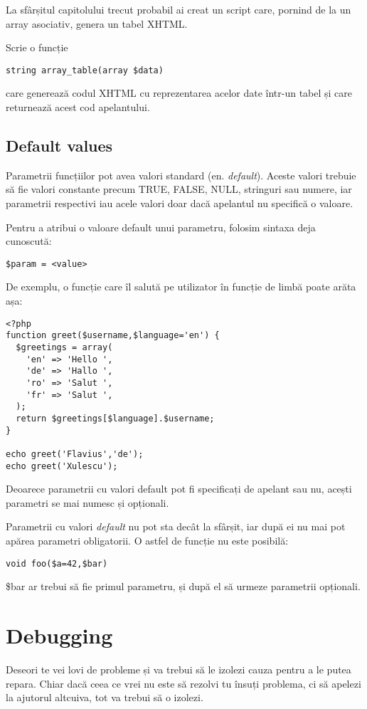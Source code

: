 \begin{Exercise}[title={Afișarea unui array bidimensional}]
La sfârșitul capitolului trecut probabil ai creat un script
care, pornind de la un array asociativ, genera un tabel XHTML.

Scrie o funcție
\begin{verbatim}
string array_table(array $data)
\end{verbatim}
care generează codul XHTML cu reprezentarea acelor date într-un tabel
și care returnează acest cod apelantului.
\end{Exercise}

\subsection{Default values}
Parametrii funcțiilor pot avea valori standard (en. \textsl{default}).
Aceste valori trebuie să fie valori constante precum TRUE, FALSE, NULL,
stringuri sau numere, iar parametrii respectivi iau acele valori doar
dacă apelantul nu specifică o valoare.

Pentru a atribui o valoare default unui parametru, folosim sintaxa deja
cunoscută:
\begin{verbatim}
$param = <value>
\end{verbatim}

De exemplu, o funcție care îl salută pe utilizator în funcție de limbă
poate arăta așa:

\begin{lstlisting}
<?php
function greet($username,$language='en') {
  $greetings = array(
	'en' => 'Hello ',
	'de' => 'Hallo ',
	'ro' => 'Salut ',
	'fr' => 'Salut ',
  );
  return $greetings[$language].$username;
}

echo greet('Flavius','de');
echo greet('Xulescu');
\end{lstlisting}
Deoarece parametrii cu valori default pot fi specificați de
apelant sau nu, acești parametri se mai numesc și opționali.

Parametrii cu valori \textit{default} nu pot sta decât
la sfârșit, iar după ei nu mai pot
apărea parametri obligatorii. O astfel de funcție nu este posibilă:
\begin{verbatim}
void foo($a=42,$bar)
\end{verbatim}
\$bar ar trebui să fie primul parametru, și după el să urmeze parametrii opționali.

\section{Debugging}
Deseori te vei lovi de probleme și va trebui să le izolezi cauza
pentru a le putea repara. Chiar dacă ceea ce vrei nu este să
rezolvi tu însuți problema, ci să apelezi la ajutorul altcuiva,
tot va trebui să o izolezi.

